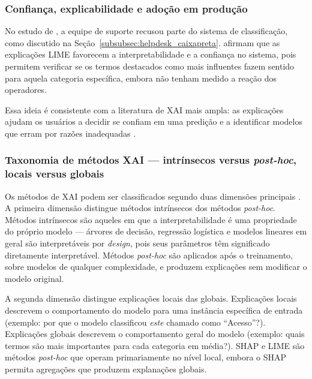 \documentclass[
    12pt,                %
    openright,           %
    oneside,             %
    a4paper,             %
    english,             %
    brazil               %
]{abntex2}
\begin{document}
\subsubsection{Confiança, explicabilidade e adoção em produção}
\label{subsubsec:xai_confianca}

No estudo de , a equipe de suporte recusou parte do sistema de 
classificação, como discutido na Seção~\ref{subsubsec:helpdesk_caixapreta}.  afirmam 
que as explicações LIME favorecem a interpretabilidade e a confiança no sistema, 
pois permitem verificar se os termos destacados como mais influentes fazem sentido 
para aquela categoria específica, embora não tenham medido a reação dos operadores.

Essa ideia é consistente com a literatura de XAI mais ampla: as explicações
 ajudam os usuários a decidir se confiam em uma predição e a identificar modelos 
 que erram por razões inadequadas \cite{ribeiro2016}.


\subsubsection{Taxonomia de métodos XAI — intrínsecos versus \textit{post-hoc}, locais versus globais}
\label{subsubsec:xai_taxonomia}

Os métodos de XAI podem ser classificados segundo duas dimensões principais \cite{salih2023}. A primeira dimensão distingue métodos intrínsecos dos métodos \textit{post-hoc}. Métodos intrínsecos são aqueles em que a interpretabilidade é uma propriedade do próprio modelo — árvores de decisão, regressão logística e modelos lineares em geral são interpretáveis por \textit{design}, pois seus parâmetros têm significado diretamente interpretável. Métodos \textit{post-hoc} são aplicados após o treinamento, sobre modelos de qualquer complexidade, e produzem explicações sem modificar o modelo original.

A segunda dimensão distingue explicações locais das globais. Explicações locais descrevem o comportamento do modelo para uma instância específica de entrada (exemplo: por que o modelo classificou \textit{este} chamado como ``Acesso''?). Explicações globais descrevem o comportamento geral do modelo (exemplo: quais termos são mais importantes para cada categoria em média?). SHAP e LIME são métodos \textit{post-hoc} que operam primariamente no nível local, embora o SHAP permita agregações que produzem explanações globais.
\end{document}
